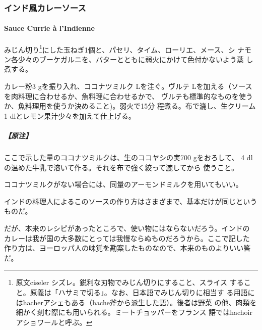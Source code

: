 \begin{recette}
\maeaki

\hypertarget{ux30a4ux30f3ux30c9ux98a8ux30abux30ecux30fcux30bdux30fcux30b9}{%
\subsubsection{インド風カレーソース}\label{ux30a4ux30f3ux30c9ux98a8ux30abux30ecux30fcux30bdux30fcux30b9}}

\hypertarget{sauce-currie-indienne}{%
\paragraph{Sauce Currie à l'Indienne}\label{sauce-currie-indienne}}


みじん切り\footnote{原文ciseler
  シズレ。鋭利な刃物でみじん切りにすること、スライス
  すること。原義は「ハサミで切る」。なお、日本語でみじん切りに相当す
  る用語にはhacherアシェもある（hache斧から派生した語）。後者は野菜
  の他、肉類を細かく刻む際にも用いられる。ミートチョッパーをフランス
  語ではhachoirアショワールと呼ぶ。}にした玉ねぎ1個と、パセリ、タイム、ローリエ、メース、シ
ナモン各少々のブーケガルニを、バターとともに弱火にかけて色付かないよう蒸
し煮する。

カレー粉3 gを振り入れ、ココナツミルク\undemi{} Lを注ぐ。ヴルテ \undemi{}
Lを加える（ソースを肉料理に合わせるか、魚料理に合わせるかで、
ヴルテも標準的なものを使うか、魚料理用を使うか決めること)。弱火で15分
程煮る。布で漉し、生クリーム1 dlとレモン果汁少々を加えて仕上げる。

\hypertarget{ux539fux6ce8-7}{%
\subparagraph{【原注】}\label{ux539fux6ce8-7}}

ここで示した量のココナツミルクは、生のココヤシの実700 gをおろして、
4\undemi{} dlの温めた牛乳で溶いて作る。それを布で強く絞って漉してから
使うこと。

ココナツミルクがない場合には、同量のアーモンドミルクを用いてもいい。

インドの料理人によるこのソースの作り方はさまざまで、基本だけが同じというものだ。

だが、本来のレシピがあったところで、使い物にはならないだろう。インドの
カレーは我が国の大多数にとっては我慢ならぬものだろうから。ここで記した
作り方は、ヨーロッパ人の味覚を勘案したものなので、本来のものよりいい筈
だ。


\end{recette}
